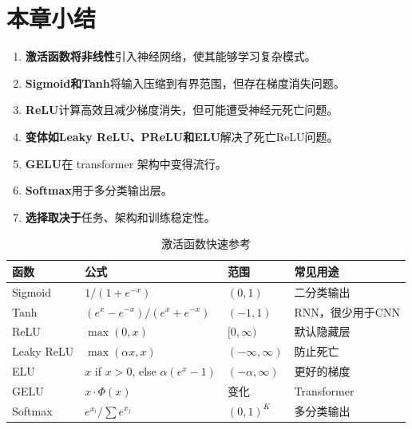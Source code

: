 \section{本章小结}

\begin{enumerate}
    \item \textbf{激活函数将非线性}引入神经网络，使其能够学习复杂模式。
    
    \item \textbf{Sigmoid和Tanh}将输入压缩到有界范围，但存在梯度消失问题。
    
    \item \textbf{ReLU}计算高效且减少梯度消失，但可能遭受神经元死亡问题。
    
    \item \textbf{变体如Leaky ReLU、PReLU和ELU}解决了死亡ReLU问题。
    
    \item \textbf{GELU}在 transformer 架构中变得流行。
    
    \item \textbf{Softmax}用于多分类输出层。
    
    \item \textbf{选择取决于}任务、架构和训练稳定性。
\end{enumerate}

\begin{table}[ht]
    \centering
    \caption{激活函数快速参考}
    \begin{tabular}{L{2.5cm} L{2.5cm} L{2cm} L{3cm}}
        \toprule
        \textbf{函数} & \textbf{公式} & \textbf{范围} & \textbf{常见用途} \\
        \midrule
        Sigmoid & $1/(1+e^{-x})$ & $(0,1)$ & 二分类输出 \\
        Tanh & $(e^x-e^{-x})/(e^x+e^{-x})$ & $(-1,1)$ & RNN，很少用于CNN \\
        ReLU & $\max(0,x)$ & $[0,\infty)$ & 默认隐藏层 \\
        Leaky ReLU & $\max(\alpha x, x)$ & $(-\infty,\infty)$ & 防止死亡 \\
        ELU & $x$ if $x>0$, else $\alpha(e^x-1)$ & $(-\alpha,\infty)$ & 更好的梯度 \\
        GELU & $x \cdot \Phi(x)$ & 变化 & Transformer \\
        Softmax & $e^{x_i}/\sum e^{x_j}$ & $(0,1)^K$ & 多分类输出 \\
        \bottomrule
    \end{tabular}
\end{table}

